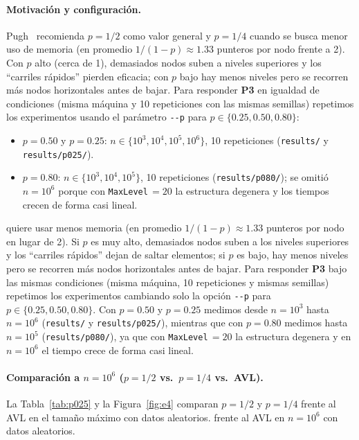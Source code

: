 \documentclass[11pt,a4paper]{article}
\begin{document}
\paragraph{Motivación y configuración.}
Pugh~\cite{pugh1990} recomienda $p=1/2$ como valor general y $p=1/4$ cuando se
busca menor uso de memoria (en promedio $1/(1-p) \approx 1.33$ punteros por
nodo frente a 2). Con $p$ alto (cerca de 1), demasiados nodos suben a niveles
superiores y los ``carriles rápidos'' pierden eficacia; con $p$ bajo hay menos
niveles pero se recorren más nodos horizontales antes de bajar. Para responder
\textbf{P3} en igualdad de condiciones (misma máquina y 10 repeticiones con las
mismas semillas) repetimos los experimentos usando el parámetro \texttt{-{}-p}
para $p \in \{0.25, 0.50, 0.80\}$:
\begin{itemize}
  \item $p = 0.50$ y $p = 0.25$: $n \in \{10^3, 10^4, 10^5, 10^6\}$, 10 repeticiones (\texttt{results/} y \texttt{results/p025/}).
  \item $p = 0.80$: $n \in \{10^3, 10^4, 10^5\}$, 10 repeticiones (\texttt{results/p080/}); se omitió $n = 10^6$ porque con \texttt{MaxLevel}$\,=20$ la estructura degenera y los tiempos crecen de forma casi lineal.
\end{itemize}
quiere usar menos memoria (en promedio $1/(1-p) \approx 1.33$ punteros por nodo
en lugar de 2). Si $p$ es muy alto, demasiados nodos suben a los niveles
superiores y los ``carriles rápidos'' dejan de saltar elementos; si $p$ es bajo,
hay menos niveles pero se recorren más nodos horizontales antes de bajar. Para
responder \textbf{P3} bajo las mismas condiciones (misma máquina, 10
repeticiones y mismas semillas) repetimos los experimentos cambiando solo la
opción \texttt{-{}-p} para $p \in \{0.25, 0.50, 0.80\}$. Con $p = 0.50$ y
$p = 0.25$ medimos desde $n = 10^3$ hasta $n = 10^6$ (\texttt{results/} y
\texttt{results/p025/}), mientras que con $p = 0.80$ medimos hasta $n = 10^5$
(\texttt{results/p080/}), ya que con \texttt{MaxLevel}$\,=20$ la estructura
degenera y en $n = 10^6$ el tiempo crece de forma casi lineal.

\paragraph{Comparación a $n = 10^6$ ($p=1/2$ vs.\ $p=1/4$ vs.\ AVL).}
La Tabla~\ref{tab:p025} y la Figura~\ref{fig:e4} comparan $p=1/2$ y $p=1/4$
frente al AVL en el tamaño máximo con datos aleatorios.
frente al AVL en $n = 10^6$ con datos aleatorios.
\end{document}
